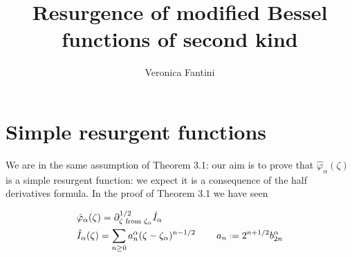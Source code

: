 \documentclass{article}
\title{Resurgence of modified Bessel functions of second kind}
\author{Veronica Fantini}
\begin{document}
\maketitle

\section{Simple resurgent functions}

We are in the same assumption of Theorem 3.1: our aim is to prove that $\hat{\varphi}_{\alpha}(\zeta)$ is a simple resurgent function: we expect it is a consequence of the half derivatives formula. In the proof of Theorem 3.1 we have seen

\begin{align}
&\hat{\varphi}_{\alpha}(\zeta)=\partial_{\zeta \text{ from } \zeta_\alpha}^{1/2}\hat{I}_{\alpha} \\
&\hat{I}_{\alpha}(\zeta)=\sum_{n\geq 0}a_n^{\alpha}(\zeta-\zeta_{\alpha})^{n-1/2}\,\qquad a_n\defeq 2^{n+1/2}b_{2n}^{\alpha}
\end{align}
\end{document}
